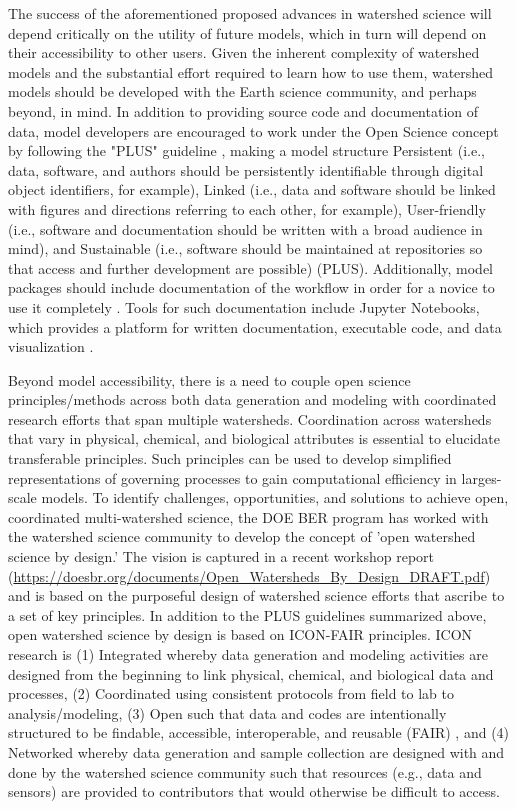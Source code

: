 \documentclass[preprint,review, 12pt]{elsarticle}
\begin{document}
The success of the aforementioned proposed advances in watershed science will depend critically on the utility of future models, which in turn will depend on their accessibility to other users. Given the inherent complexity of watershed models and the substantial effort required to learn how to use them, watershed models should be developed with the Earth science community, and perhaps beyond, in mind. In addition to providing source code and documentation of data, model developers are encouraged to work under the Open Science concept by following the "PLUS" guideline \citep{Yu2016}, making a model structure Persistent (i.e., data, software, and authors should be persistently identifiable through digital object identifiers, for example), Linked (i.e., data and software should be linked with figures and directions referring to each other, for example), User-friendly (i.e., software and documentation should be written with a broad audience in mind), and Sustainable (i.e., software should be maintained at repositories so that access and further development are possible) (PLUS). Additionally, model packages should include documentation of the workflow in order for a novice to use it completely \citep{Yu2016}. Tools for such documentation include Jupyter Notebooks, which provides a platform for written documentation, executable code, and data visualization \citep{Fienen2016, White2016}.
 
 Beyond model accessibility, there is a need to couple open science principles/methods across both data generation and modeling with coordinated research efforts that span multiple watersheds. Coordination across watersheds that vary in physical, chemical, and biological attributes is essential to elucidate transferable principles. Such principles can be used to develop simplified representations of governing processes to gain computational efficiency in larges-scale models. To identify challenges, opportunities, and solutions to achieve open, coordinated multi-watershed science, the DOE BER program has worked with the watershed science community to develop the concept of 'open watershed science by design.' The vision is captured in a recent workshop report (\url{https://doesbr.org/documents/Open_Watersheds_By_Design_DRAFT.pdf}) and is based on the purposeful design of watershed science efforts that ascribe to a set of key principles. In addition to the PLUS guidelines summarized above, open watershed science by design is based on ICON-FAIR principles. ICON research is (1) Integrated whereby data generation and modeling activities are designed from the beginning to link physical, chemical, and biological data and processes, (2) Coordinated using consistent protocols from field to lab to analysis/modeling, (3) Open such that data and codes are intentionally structured to be findable, accessible, interoperable, and reusable (FAIR) \citep{Wilkinson2016}, and (4) Networked whereby data generation and sample collection are designed with and done by the watershed science community such that resources (e.g., data and sensors) are provided to contributors that would otherwise be difficult to access. 
 
\end{document}
